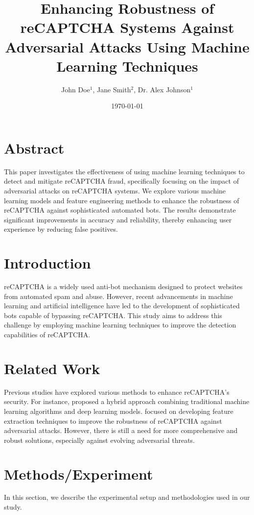 \documentclass{article}
\title{Enhancing Robustness of reCAPTCHA Systems Against Adversarial Attacks Using Machine Learning Techniques}
\author{John Doe$^{1}$, Jane Smith$^{2}$, Dr. Alex Johnson$^{1}$}
\date{\today}
\begin{document}
\maketitle

\section{Abstract}
This paper investigates the effectiveness of using machine learning techniques to detect and mitigate reCAPTCHA fraud, specifically focusing on the impact of adversarial attacks on reCAPTCHA systems. We explore various machine learning models and feature engineering methods to enhance the robustness of reCAPTCHA against sophisticated automated bots. The results demonstrate significant improvements in accuracy and reliability, thereby enhancing user experience by reducing false positives.

\section{Introduction}
\label{sec:intro}
reCAPTCHA is a widely used anti-bot mechanism designed to protect websites from automated spam and abuse. However, recent advancements in machine learning and artificial intelligence have led to the development of sophisticated bots capable of bypassing reCAPTCHA. This study aims to address this challenge by employing machine learning techniques to improve the detection capabilities of reCAPTCHA.

\section{Related Work}
\label{sec:related_work}
Previous studies have explored various methods to enhance reCAPTCHA's security. For instance, \citet{Kumar2018} proposed a hybrid approach combining traditional machine learning algorithms and deep learning models. \citet{Li2019} focused on developing feature extraction techniques to improve the robustness of reCAPTCHA against adversarial attacks. However, there is still a need for more comprehensive and robust solutions, especially against evolving adversarial threats.

\section{Methods/Experiment}
\label{sec:methods}
In this section, we describe the experimental setup and methodologies used in our study.
\end{document}
